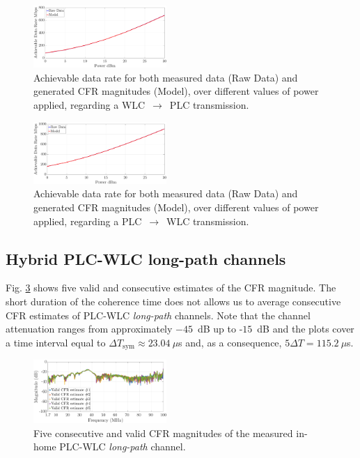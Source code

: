\documentclass[journal]{IEEEtran}
\begin{document}
\begin{figure}[h]
	\centering
	\includegraphics[width=0.45\textwidth]{images/Capacidade_SP_PLCnoise.eps}
	\caption{Achievable data rate for both measured data (Raw Data) and generated CFR magnitudes (Model), over different values of power applied, regarding a WLC~$\rightarrow$~PLC transmission.}
	\label{Cap_SP_PLC}
\end{figure}

\begin{figure}[h]
	\centering
	\includegraphics[width=0.45\textwidth]{images/Capacidade_SP_WLCnoise.eps}
	\caption{Achievable data rate for both measured data (Raw Data) and generated CFR magnitudes (Model), over different values of power applied, regarding a PLC~$\rightarrow$~WLC transmission.}
	\label{Cap_SP_WLC}
\end{figure}

\subsection{Hybrid PLC-WLC long-path channels}\label{sec:MMHYBL}

Fig. \ref{respfreqlW} shows five valid and consecutive estimates of the \ac{CFR} magnitude. The short duration of the coherence time does not allows us to average consecutive \ac{CFR} estimates of \ac{PLC}-\ac{WLC} \textit{long-path} channels. Note that the channel attenuation ranges from approximately $-45$~dB up to -$15$~dB and the plots cover a time interval equal to $\Delta T_{\textrm{sym}}\approx23.04~\mu$s and, as a consequence, $5\Delta T = 115.2~\mu$s.

\begin{figure}[h]
	\centering
	\includegraphics[width=0.45\textwidth]{images/respfreqlW.eps}
	\caption{Five consecutive and valid CFR magnitudes of the measured in-home PLC-WLC \textit{long-path} channel.}
	\label{respfreqlW}
\end{figure}
\end{document}
